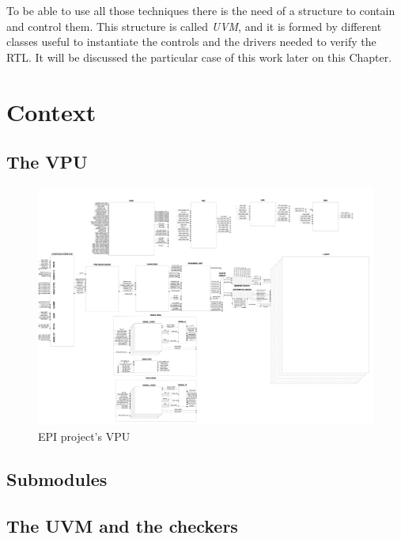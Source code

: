 To be able to use all those techniques there is the need of a structure to contain and control them.
This structure is called \textit{UVM}, and it is formed by different classes useful to instantiate the controls and the drivers needed to verify the RTL. It will be discussed the particular case of this work later on this Chapter.

\section{Context}
\subsection{The VPU}
\begin{figure}[H]
    \centering
    \includegraphics[scale = 0.07]{Chapter_1/img/VPU-wo-LANE.jpg}
    \caption{EPI project's VPU}
    \label{VPU-wo-LANE}
\end{figure}

\subsection{Submodules}

\subsection{The UVM and the checkers}

